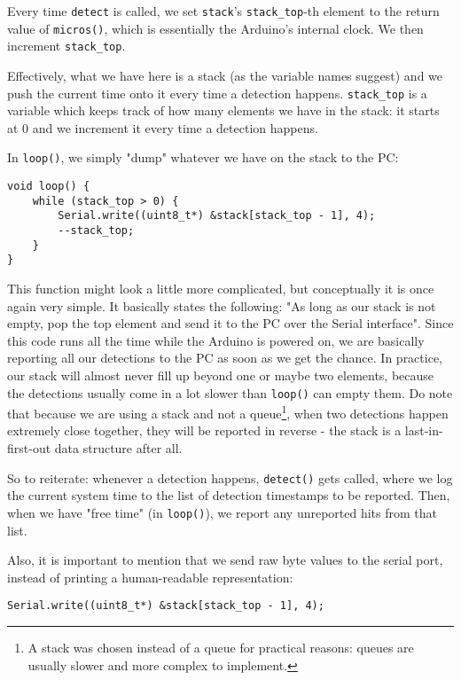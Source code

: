\documentclass[11pt]{article}
\begin{document}
Every time \texttt{detect} is called, we set \texttt{stack}'s \texttt{stack\_top}-th element to the return value of \texttt{micros()}, which is essentially the Arduino's internal clock. We then increment \texttt{stack\_top}.

Effectively, what we have here is a stack (as the variable names suggest) and we push the current time onto it every time a detection happens. \texttt{stack\_top} is a variable which keeps track of how many elements we have in the stack: it starts at 0 and we increment it every time a detection happens.

In \texttt{loop()}, we simply "dump" whatever we have on the stack to the PC:

\begin{verbatim}
void loop() {
    while (stack_top > 0) {
        Serial.write((uint8_t*) &stack[stack_top - 1], 4);
        --stack_top;
    }
}
\end{verbatim}

This function might look a little more complicated, but conceptually it is once again very simple. It basically states the following: "As long as our stack is not empty, pop the top element and send it to the PC over the Serial interface". Since this code runs all the time while the Arduino is powered on, we are basically reporting all our detections to the PC as soon as we get the chance. In practice, our stack will almost never fill up beyond one or maybe two elements, because the detections usually come in a lot slower than \texttt{loop()} can empty them. Do note that because we are using a stack and not a queue\footnote{A stack was chosen instead of a queue for practical reasons: queues are usually slower and more complex to implement.}, when two detections happen extremely close together, they will be reported in reverse - the stack is a last-in-first-out data structure after all.

So to reiterate: whenever a detection happens, \texttt{detect()} gets called, where we log the current system time to the list of detection timestamps to be reported. Then, when we have "free time" (in \texttt{loop()}), we report any unreported hits from that list.

Also, it is important to mention that we send raw byte values to the serial port, instead of printing a human-readable representation:
\begin{verbatim}
Serial.write((uint8_t*) &stack[stack_top - 1], 4);
\end{verbatim}
\end{document}
